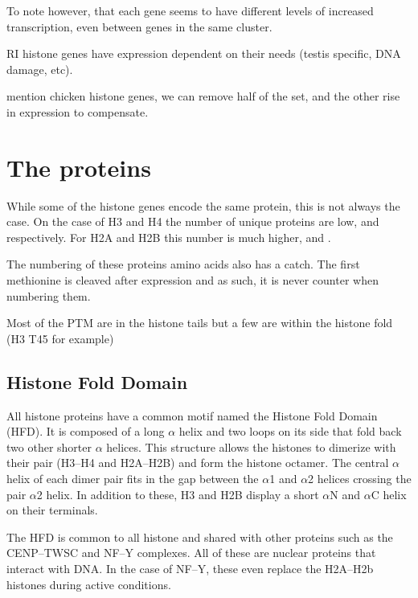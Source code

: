 \documentclass[10pt,a4paper,onecolumn,article]{memoir}
\begin{document}
      To note however, that each gene seems to have different levels of increased transcription, even between genes in the
      same cluster.

      RI histone genes have expression dependent on their needs (testis specific, DNA damage, etc).

      mention chicken histone genes, we can remove half of the set, and the other rise in expression to compensate.


  \section{The proteins}
    While some of the histone genes encode the same protein, this is not always the
    case. On the case of H3 and H4 the number of unique proteins are low, \TotalHThree{}
    and \TotalHFour{} respectively. For H2A and H2B this number is much higher, \TotalHTwoA{}
    and \TotalHTwoB{}.

    The numbering of these proteins amino acids also has a catch. The first methionine
    is cleaved after expression and as such, it is never counter when numbering them.

    Most of the PTM are in the histone tails but a few are within the histone fold (H3 T45 for example)

    \subsection{Histone Fold Domain}

      All histone proteins have a common motif named the Histone Fold Domain (HFD).
      It is composed of a long $\alpha$ helix and two loops on its side that fold
      back two other shorter $\alpha$ helices. This structure allows the histones
      to dimerize with their pair (H3--H4 and H2A--H2B) and form the histone
      octamer. The central $\alpha$ helix of each dimer pair fits in the gap between
      the $\alpha$1 and $\alpha$2 helices crossing the pair $\alpha$2 helix. In
      addition to these, H3 and H2B display a short $\alpha$N and $\alpha$C helix
      on their terminals.

      The HFD is common to all histone and shared with other
      proteins such as the CENP--TWSC and NF--Y complexes. All of these are nuclear
      proteins that interact with DNA. In the case of NF--Y, these even replace
      the H2A--H2b histones during active conditions.
\end{document}

